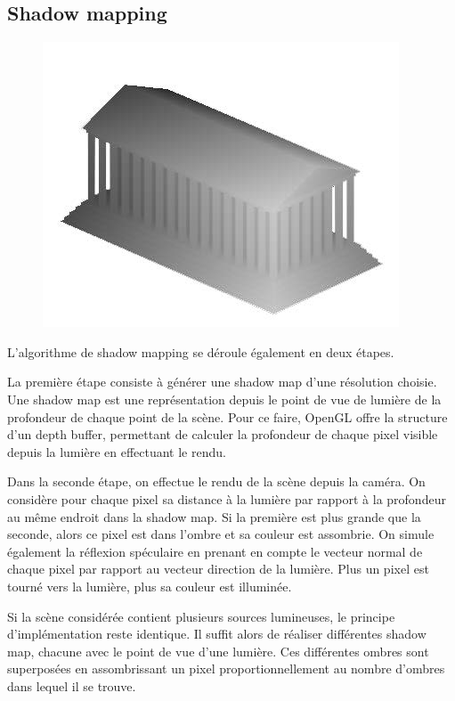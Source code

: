 \documentclass[a4paper,10pt]{report}
\begin{document}
\subsection{Shadow mapping}

\begin{figure}[H]
\includegraphics[scale=0.5]{images/shadow_map.jpg}
\centering
{}
\end{figure}

L'algorithme de shadow mapping se déroule également en deux étapes.

La première étape consiste à générer une shadow map d'une résolution choisie. Une shadow map est une représentation depuis le point de vue de lumière de la profondeur de chaque point de la scène. Pour ce faire, OpenGL offre la structure d'un depth buffer, permettant de calculer la profondeur de chaque pixel visible depuis la lumière en effectuant le rendu.

Dans la seconde étape, on effectue le rendu de la scène depuis la caméra. On considère pour chaque pixel sa distance à la lumière par rapport à la profondeur au même endroit dans la shadow map. Si la première est plus grande que la seconde, alors ce pixel est dans l'ombre et sa couleur est assombrie.
On simule également la réflexion spéculaire en prenant en compte le vecteur normal de chaque pixel par rapport au vecteur direction de la lumière. Plus un pixel est tourné vers la lumière, plus sa couleur est illuminée.

Si la scène considérée contient plusieurs sources lumineuses, le principe d'implémentation reste identique. Il suffit alors de réaliser différentes shadow map, chacune avec le point de vue d'une lumière. Ces différentes ombres sont superposées en assombrissant un pixel proportionnellement au nombre d'ombres dans lequel il se trouve.
\end{document}
